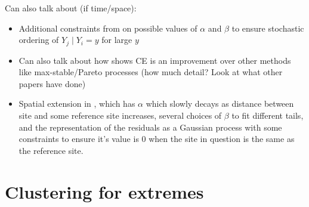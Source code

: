 \documentclass{article}
\numberwithin{equation}{section}
\begin{document}
Can also talk about (if time/space):
\begin{itemize}
  \item Additional constraints from \cite{Keef2013} on possible values of $\alpha$ and $\beta$ to ensure stochastic ordering of $Y_j \mid Y_i = y$ for large $y$ 
  \item Can also talk about how \cite{Tawn2018} shows CE is an improvement over other methods like max-stable/Pareto processes (how much detail? Look at what other papers have done)
  \item Spatial extension in \cite{Wadsworth2018}, which has $\alpha$ which slowly decays as distance between site and some reference site increases, several choices of $\beta$ to fit different tails, and the representation of the residuals as a Gaussian process with some constraints to ensure it's value is 0 when the site in question is the same as the reference site. 
\end{itemize}


\section{Clustering for extremes}\label{sec:clustering}
\end{document}
